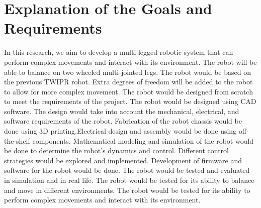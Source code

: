 \section{Explanation of the Goals and Requirements}
In this research, we aim to develop a multi-legged robotic system that can perform complex movements and interact with its environment.
The robot will be able to balance on two wheeled multi-jointed legs.
The robot would be based on the previous TWIPR robot.
Extra degrees of freedom will be added to the robot to allow for more complex movement.
The robot would be designed from scratch to meet the requirements of the project.
The robot would be designed using CAD software.
The design would take into account the mechanical, electrical, and software requirements of the robot.
Fabrication of the robot chassis would be done using 3D printing.Electrical design and assembly would be done using off-the-shelf components.
Mathematical modeling and simulation of the robot would be done to determine the robot's dynamics and control.
Different control strategies would be explored and implemented.
Development of firmware and software for the robot would be done.
The robot would be tested and evaluated in simulation and in real life.
The robot would be tested for its ability to balance and move in different environments. The robot would be tested for its ability to perform complex movements and interact with its environment.
